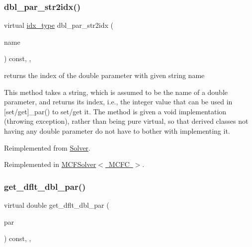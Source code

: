 \subsubsection{\texorpdfstring{dbl\+\_\+par\+\_\+str2idx()}{dbl\_par\_str2idx()}}
{\footnotesize\ttfamily virtual \mbox{\hyperlink{class_s_m_spp__di__unipi__it_1_1_thin_compute_interface_aa3d710629ad8c434286726ad810c3b47}{idx\+\_\+type}} dbl\+\_\+par\+\_\+str2idx (\begin{DoxyParamCaption}\item[{const std\+::string \&}]{name }\end{DoxyParamCaption}) const\hspace{0.3cm}{\ttfamily [inline]}, {\ttfamily [override]}, {\ttfamily [virtual]}}



returns the index of the double parameter with given string name 

This method takes a string, which is assumed to be the name of a double parameter, and returns its index, i.\+e., the integer value that can be used in \mbox{[}set/get\mbox{]}\+\_\+par() to set/get it. The method is given a void implementation (throwing exception), rather than being pure virtual, so that derived classes not having any double parameter do not have to bother with implementing it. 

Reimplemented from \mbox{\hyperlink{class_s_m_spp__di__unipi__it_1_1_solver_a6d353ac3d1200d9bea89235da61bc4f3}{Solver}}.



Reimplemented in \mbox{\hyperlink{class_s_m_spp__di__unipi__it_1_1_m_c_f_solver_a6d353ac3d1200d9bea89235da61bc4f3}{M\+C\+F\+Solver$<$ M\+C\+F\+C $>$}}.

\mbox{\label{class_s_m_spp__di__unipi__it_1_1_c_d_a_solver_a465a771c115acf8d5f4e32e22f003014}} 
\subsubsection{\texorpdfstring{get\+\_\+dflt\+\_\+dbl\+\_\+par()}{get\_dflt\_dbl\_par()}}
{\footnotesize\ttfamily virtual double get\+\_\+dflt\+\_\+dbl\+\_\+par (\begin{DoxyParamCaption}\item[{const \mbox{\hyperlink{class_s_m_spp__di__unipi__it_1_1_thin_compute_interface_aa3d710629ad8c434286726ad810c3b47}{idx\+\_\+type}}}]{par }\end{DoxyParamCaption}) const\hspace{0.3cm}{\ttfamily [inline]}, {\ttfamily [override]}, {\ttfamily [virtual]}}



